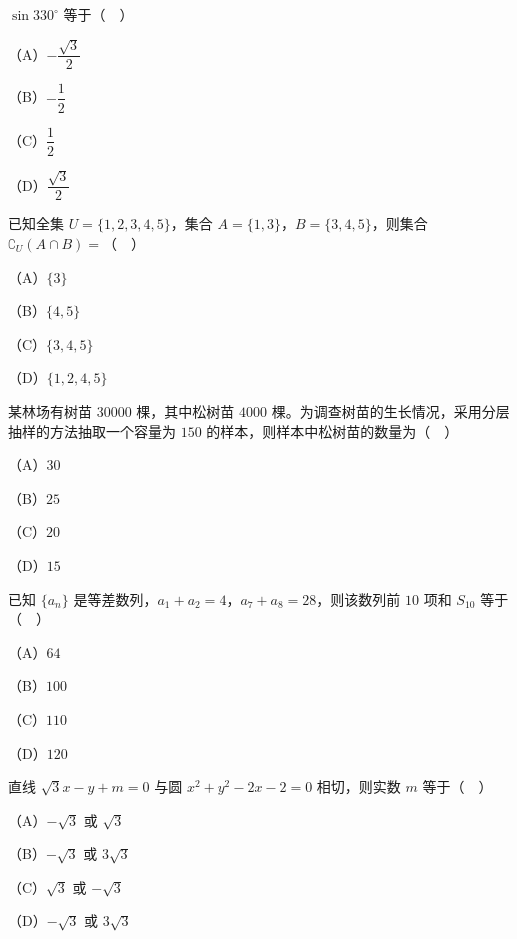 


\begin{question}
$\sin330^\circ$ 等于（　）

（A）$-\dfrac{\sqrt3}2$

（B）$-\dfrac12$

（C）$\dfrac12$

（D）$\dfrac{\sqrt3}2$

\end{question}
\begin{question}
已知全集 $U=\{1,2,3,4,5\}$，集合 $A=\{1,3\}$，$B=\{3,4,5\}$，则集合 $\complement_U(A\cap B)=$（　）

（A）$\{3\}$

（B）$\{4,5\}$

（C）$\{3,4,5\}$

（D）$\{1,2,4,5\}$

\end{question}
\begin{question}
某林场有树苗 $30000$ 棵，其中松树苗 $4000$ 棵。为调查树苗的生长情况，采用分层抽样的方法抽取一个容量为 $150$ 的样本，则样本中松树苗的数量为（　）

（A）$30$

（B）$25$

（C）$20$

（D）$15$

\end{question}
\begin{question}
已知 $\{a_n\}$ 是等差数列，$a_1+a_2=4$，$a_7+a_8=28$，则该数列前 $10$ 项和 $S_{10}$ 等于（　）

（A）$64$

（B）$100$

（C）$110$

（D）$120$

\end{question}
\begin{question}
直线 $\sqrt3x-y+m=0$ 与圆 $x^2+y^2-2x-2=0$ 相切，则实数 $m$ 等于（　）

（A）$-\sqrt3$ 或 $\sqrt3$

（B）$-\sqrt3$ 或 $3\sqrt3$

（C）$\sqrt3$ 或 $-\sqrt3$

（D）$-\sqrt3$ 或 $3\sqrt3$

\end{question}
